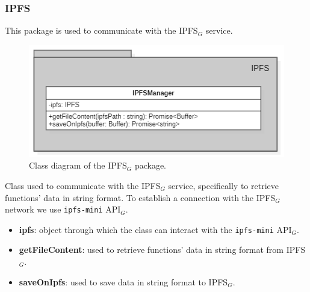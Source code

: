 	\subsubsection{IPFS}
	This package is used to communicate with the IPFS$_{G}$ service.
	\begin{figure} [h!]
		\centering
		\includegraphics[width=0.8\linewidth]{diagrammi/etherless-server/IPFS}
		\caption{Class diagram of the IPFS$_{G}$ package.}
	\end{figure}
	Class used to communicate with the IPFS$_{G}$ service, specifically to retrieve functions' data in string format. To establish a connection with the IPFS$_{G}$ network we use \texttt{ipfs-mini} API$_{G}$. 
	\begin{itemize}
		\item \textbf{ipfs}: object through which the class can interact with the \texttt{ipfs-mini} API$_{G}$.
	\end{itemize}
	\begin{itemize}
		\item \textbf{getFileContent}: used to retrieve functions' data in string format from IPFS$_{G}$.
		\item \textbf{saveOnIpfs}: used to save data in string format to IPFS$_{G}$.
	\end{itemize}

